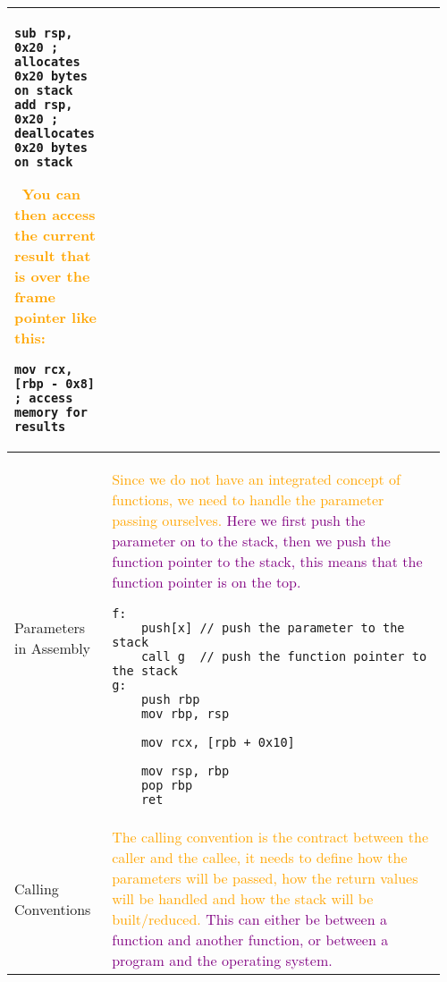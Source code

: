 \documentclass[main.tex,fontsize=8pt,paper=a4,paper=portrait,DIV=calc,]{scrartcl}
\begin{document}
\begin{table}[ht!]
\begin{tabular}{|m{0.2\linewidth}|m{0.755\linewidth}|}
\begin{lstlisting}
sub rsp, 0x20 ; allocates 0x20 bytes on stack
add rsp, 0x20 ; deallocates 0x20 bytes on stack
\end{lstlisting} 
\, \newline
\textcolor{orange}{You can then access the current result that is over the frame pointer like this:}\newline
\begin{lstlisting}
mov rcx, [rbp - 0x8] ; access memory for results
\end{lstlisting}\\
\hline
Parameters in Assembly & 
\textcolor{orange}{Since we do not have an integrated concept of functions, we need to handle the parameter passing ourselves.}\newline
\textcolor{purple}{Here we first push the parameter on to the stack, then we push the function pointer to the stack, this means that the function pointer is on the top.}\newline
\begin{lstlisting}
f: 
    push[x] // push the parameter to the stack
    call g  // push the function pointer to the stack
g: 
    push rbp 
    mov rbp, rsp 
     
    mov rcx, [rpb + 0x10]

    mov rsp, rbp 
    pop rbp 
    ret
\end{lstlisting}\\
\hline
Calling Conventions & 
\textcolor{orange}{The calling convention is the contract between the caller and the callee, it needs to define how the parameters will be passed, how the return values will be handled and how the stack will be built/reduced.}\newline
\textcolor{purple}{This can either be between a function and another function, or between a program and the operating system.}\\
\hline
\end{tabular}
\end{table}
\end{document}
